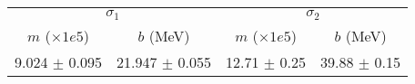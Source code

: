 \begin{tabular}{cc|cc}
\multicolumn{2}{c|}{$\sigma_1$} & \multicolumn{2}{|c}{$\sigma_2$} \\
$m$ ($\times1e5$) & $b$ (MeV) & $m$ ($\times1e5$) & $b$ (MeV) \\
\hline
9.024 $\pm$ 0.095 & 21.947 $\pm$ 0.055 & 12.71 $\pm$ 0.25 & 39.88 $\pm$ 0.15\\
\end{tabular}
